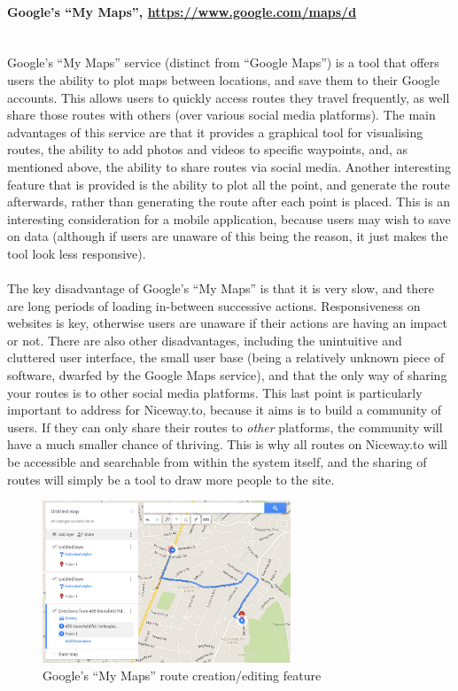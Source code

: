 \paragraph{Google's ``My Maps'', \url{https://www.google.com/maps/d}}\ \\
Google's ``My Maps'' service (distinct from ``Google Maps'') is a tool that offers users the ability to plot maps between locations, and save them to their Google accounts. This allows users to quickly access routes they travel frequently, as well share those routes with others (over various social media platforms). The main advantages of this service are that it provides a graphical tool for visualising routes, the ability to add photos and videos to specific waypoints, and, as mentioned above, the ability to share routes via social media. Another interesting feature that is provided is the ability to plot all the point, and generate the route afterwards, rather than generating the route after each point is placed. This is an interesting consideration for a mobile application, because users may wish to save on data (although if users are unaware of this being the reason, it just makes the tool look less responsive).\ \\
\ \\
The key disadvantage of Google's ``My Maps'' is that it is very slow, and there are long periods of loading in-between successive actions. Responsiveness on websites is key, otherwise users are unaware if their actions are having an impact or not. There are also other disadvantages, including the unintuitive and cluttered user interface, the small user base (being a relatively unknown piece of software, dwarfed by the Google Maps service), and that the only way of sharing your routes is to other social media platforms. This last point is particularly important to address for Niceway.to, because it aims is to build a community of users. If they can only share their routes to \textit{other} platforms, the community will have a much smaller chance of thriving. This is why all routes on Niceway.to will be accessible and searchable from within the system itself, and the sharing of routes will simply be a tool to draw more people to the site.

\begin{figure}[!ht]
	\begin{center}
		\includegraphics[width=0.66\textwidth]{images/background/gm_rcp.png}
	\end{center}
	\vspace{-6mm}
	\caption{Google's ``My Maps'' route creation/editing feature}
	\vspace{-6mm}
\end{figure}

